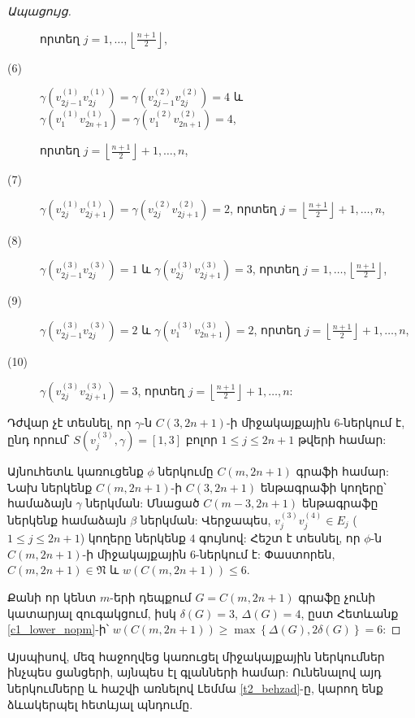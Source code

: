 \begin{proof}[Ապացույց]
\begin{description}
որտեղ $j=1,\ldots,\left\lfloor\frac{n+1}{2}\right\rfloor,$

\item[(6)]
$\gamma\left(v_{2j-1}^{(1)}v_{2j}^{(1)}\right)=\gamma\left(v_{2j-1}^{(2)}v_{2j}^{(2)}\right)=4$
և
$\gamma\left(v_{1}^{(1)}v_{2n+1}^{(1)}\right)=\gamma\left(v_{1}^{(2)}v_{2n+1}^{(2)}\right)=4$,

 որտեղ $j=\left\lfloor\frac{n+1}{2}\right\rfloor+1,\ldots,n$,

\item[(7)]
$\gamma\left(v_{2j}^{(1)}v_{2j+1}^{(1)}\right)=\gamma\left(v_{2j}^{(2)}v_{2j+1}^{(2)}\right)=2$, որտեղ $j=\left\lfloor\frac{n+1}{2}\right\rfloor+1,\ldots,n$,

\item[(8)]
$\gamma\left(v_{2j-1}^{(3)}v_{2j}^{(3)}\right)=1$ և $\gamma\left(v_{2j}^{(3)}v_{2j+1}^{(3)}\right)=3$, որտեղ $j=1,\ldots,\left\lfloor\frac{n+1}{2}\right\rfloor$,

\item[(9)]
$\gamma\left(v_{2j-1}^{(3)}v_{2j}^{(3)}\right)=2$ և $\gamma\left(v_{1}^{(3)}v_{2n+1}^{(3)}\right)=2$, որտեղ $j=\left\lfloor\frac{n+1}{2}\right\rfloor+1,\ldots,n$,

\item[(10)]
$\gamma\left(v_{2j}^{(3)}v_{2j+1}^{(3)}\right)=3$, որտեղ $j=\left\lfloor\frac{n+1}{2}\right\rfloor+1,\ldots,n$:
\end{description}

Դժվար չէ տեսնել, որ $\gamma$-ն $C(3,2n+1)$-ի միջակայքային $6$-ներկում է, ընդ որում՝ $S(v_{j}^{(3)},\gamma)=[1,3]$ բոլոր $1\leq
j\leq 2n+1$ թվերի համար:

Այնուհետև կառուցենք $\phi$ ներկումը $C(m,2n+1)$ գրաֆի համար: Նախ ներկենք $C(m,2n+1)$-ի $C(3,2n+1)$ ենթագրաֆի կողերը՝ համաձայն $\gamma$ ներկման: Մնացած $C(m-3,2n+1)$ ենթագրաֆը ներկենք համաձայն $\beta$ ներկման: Վերջապես, $v_{j}^{(3)}v_{j}^{(4)}\in E_{j}$ ($1\leq j\leq 2n+1$) կողերը ներկենք $4$ գույնով: Հեշտ է տեսնել, որ $\phi$-ն $C(m,2n+1)$-ի միջակայքային $6$-ներկում է: Փաստորեն, $C(m,2n+1)\in \mathfrak{N}$ և $w(C(m,2n+1))\leq 6$.

Քանի որ կենտ $m$-երի դեպքում $G=C(m,2n+1)$ գրաֆը չունի կատարյալ զուգակցում, իսկ $\delta(G)=3$, $\Delta(G)=4$, ըստ Հետևանք \ref{c1_lower_nopm}-ի՝ $w(C(m,2n+1))\geq \max\left\{\Delta(G),2\delta(G)\right\} = 6$:
\end{proof}

Այսպիսով, մեզ հաջողվեց կառուցել միջակայքային ներկումներ ինչպես ցանցերի, այնպես էլ գլանների համար: Ունենալով այդ ներկումները և հաշվի առնելով Լեմմա \ref{t2_behzad}-ը, կարող ենք ձևակերպել հետևյալ պնդումը.

